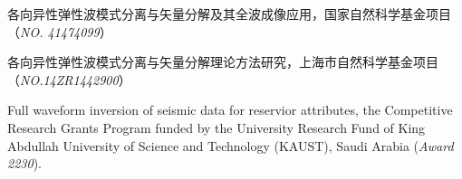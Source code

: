 
\begin{projects}{99}
%
    \item 各向异性弹性波模式分离与矢量分解及其全波成像应用，国家自然科学基金项目
		（\textit{NO. 41474099}）
	\item 各向异性弹性波模式分离与矢量分解理论方法研究，上海市自然科学基金项目
		（\textit{NO.14ZR1442900}）
	\item Full waveform inversion of seismic data for reservior attributes, the Competitive
		Research Grants Program funded by the University Research Fund of King Abdullah University
		of Science and Technology (KAUST), Saudi Arabia (\textit{Award 2230}).     
\end{projects}
